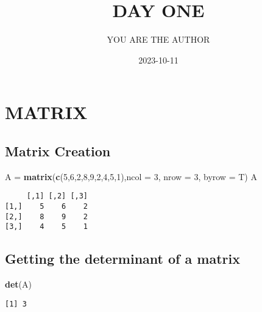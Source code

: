 \documentclass[
]{article}
\title{DAY ONE}
\author{YOU ARE THE AUTHOR}
\date{2023-10-11}
\newenvironment{Shaded}{\begin{snugshade}}{\end{snugshade}}
\newcommand{\AttributeTok}[1]{\textcolor[rgb]{0.13,0.29,0.53}{#1}}
\newcommand{\DecValTok}[1]{\textcolor[rgb]{0.00,0.00,0.81}{#1}}
\newcommand{\FunctionTok}[1]{\textcolor[rgb]{0.13,0.29,0.53}{\textbf{#1}}}
\newcommand{\NormalTok}[1]{#1}
\newcommand{\OtherTok}[1]{\textcolor[rgb]{0.56,0.35,0.01}{#1}}
\begin{document}
\maketitle

{
\setcounter{tocdepth}{2}
\tableofcontents
}
\newpage

\hypertarget{matrix}{%
\section{MATRIX}\label{matrix}}

\hypertarget{matrix-creation}{%
\subsection{Matrix Creation}\label{matrix-creation}}

\begin{Shaded}
\begin{Highlighting}[]
\NormalTok{A }\OtherTok{=} \FunctionTok{matrix}\NormalTok{(}\FunctionTok{c}\NormalTok{(}\DecValTok{5}\NormalTok{,}\DecValTok{6}\NormalTok{,}\DecValTok{2}\NormalTok{,}\DecValTok{8}\NormalTok{,}\DecValTok{9}\NormalTok{,}\DecValTok{2}\NormalTok{,}\DecValTok{4}\NormalTok{,}\DecValTok{5}\NormalTok{,}\DecValTok{1}\NormalTok{),}\AttributeTok{ncol =} \DecValTok{3}\NormalTok{, }\AttributeTok{nrow =} \DecValTok{3}\NormalTok{, }\AttributeTok{byrow =}\NormalTok{ T)}
\NormalTok{A}
\end{Highlighting}
\end{Shaded}

\begin{verbatim}
     [,1] [,2] [,3]
[1,]    5    6    2
[2,]    8    9    2
[3,]    4    5    1
\end{verbatim}

\hypertarget{getting-the-determinant-of-a-matrix}{%
\subsection{Getting the determinant of a
matrix}\label{getting-the-determinant-of-a-matrix}}

\begin{Shaded}
\begin{Highlighting}[]
\FunctionTok{det}\NormalTok{(A)}
\end{Highlighting}
\end{Shaded}

\begin{verbatim}
[1] 3
\end{verbatim}
\end{document}
